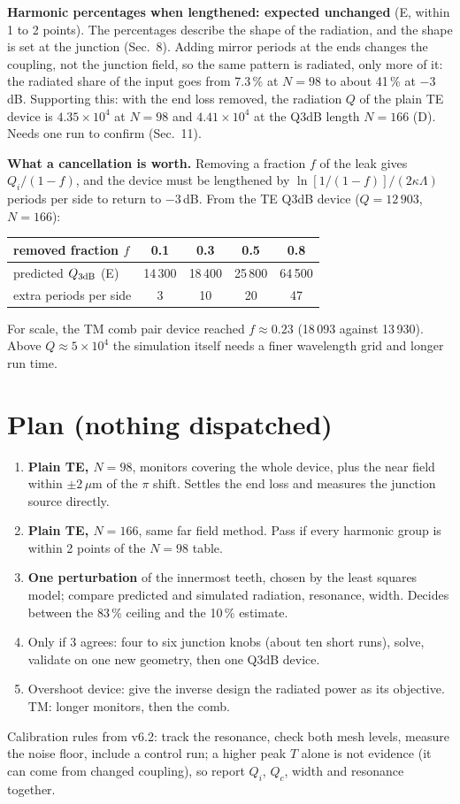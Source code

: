 \documentclass[11pt,a4paper]{article}
\begin{document}
\textbf{Harmonic percentages when lengthened: expected unchanged} (E, within 1 to 2 points). The percentages describe the
shape of the radiation, and the shape is set at the junction (Sec.~8). Adding mirror periods at the ends changes the
coupling, not the junction field, so the same pattern is radiated, only more of it: the radiated share of the input goes
from 7.3\,\% at $N=98$ to about 41\,\% at $-3$\,dB. Supporting this: with the end loss removed, the radiation $Q$ of the
plain TE device is $4.35\times10^4$ at $N=98$ and $4.41\times10^4$ at the Q3dB length $N=166$ (D). Needs one run to
confirm (Sec.~11).

\textbf{What a cancellation is worth.} Removing a fraction $f$ of the leak gives $Q_i/(1-f)$, and the device must be
lengthened by $\ln[1/(1-f)]/(2\kappa\Lambda)$ periods per side to return to $-3$\,dB. From the TE Q3dB device
($Q=12\,903$, $N=166$):
\begin{center}\small\begin{tabular}{lcccc}\hline
removed fraction $f$ & 0.1 & 0.3 & 0.5 & 0.8\\\hline
predicted $Q_{3\rm dB}$ (E) & 14\,300 & 18\,400 & 25\,800 & 64\,500\\
extra periods per side & 3 & 10 & 20 & 47\\\hline
\end{tabular}\end{center}
For scale, the TM comb pair device reached $f\approx0.23$ (18\,093 against 13\,930). Above $Q\approx5\times10^4$ the
simulation itself needs a finer wavelength grid and longer run time.

\section{Plan (nothing dispatched)}
\begin{enumerate}\setlength{\itemsep}{1pt}
\item \textbf{Plain TE, $N=98$}, monitors covering the whole device, plus the near field within $\pm2$\,$\mu$m of the
$\pi$ shift. Settles the end loss and measures the junction source directly.
\item \textbf{Plain TE, $N=166$}, same far field method. Pass if every harmonic group is within 2 points of the $N=98$
table.
\item \textbf{One perturbation} of the innermost teeth, chosen by the least squares model; compare predicted and
simulated radiation, resonance, width. Decides between the 83\,\% ceiling and the 10\,\% estimate.
\item Only if 3 agrees: four to six junction knobs (about ten short runs), solve, validate on one new geometry, then one
Q3dB device.
\item Overshoot device: give the inverse design the radiated power as its objective. TM: longer monitors, then the comb.
\end{enumerate}
Calibration rules from v6.2: track the resonance, check both mesh levels, measure the noise floor, include a control
run; a higher peak $T$ alone is not evidence (it can come from changed coupling), so report $Q_i$, $Q_c$, width and
resonance together.
\end{document}
